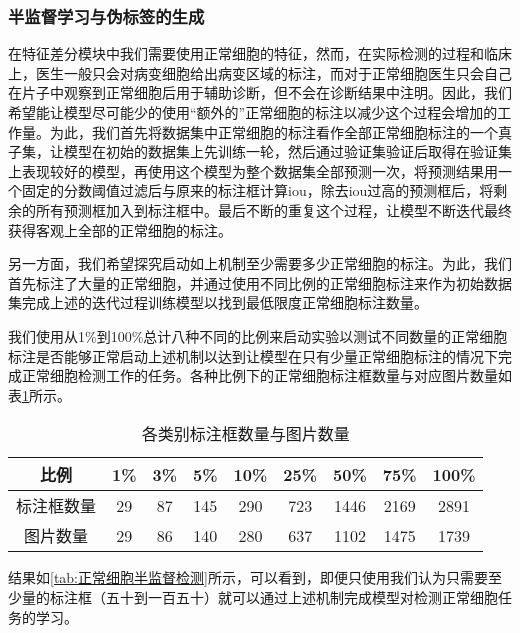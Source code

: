 \subsubsection{半监督学习与伪标签的生成}
\label{半监督学习与伪标签的生成}
\par 在特征差分模块中我们需要使用正常细胞的特征，然而，在实际检测的过程和临床上，医生一般只会对病变细胞给出病变区域的标注，而对于正常细胞医生只会自己在片子中观察到正常细胞后用于辅助诊断，但不会在诊断结果中注明。因此，我们希望能让模型尽可能少的使用“额外的”正常细胞的标注以减少这个过程会增加的工作量。为此，我们首先将数据集中正常细胞的标注看作全部正常细胞标注的一个真子集，让模型在初始的数据集上先训练一轮，然后通过验证集验证后取得在验证集上表现较好的模型，再使用这个模型为整个数据集全部预测一次，将预测结果用一个固定的分数阈值过滤后与原来的标注框计算iou，除去iou过高的预测框后，将剩余的所有预测框加入到标注框中。最后不断的重复这个过程，让模型不断迭代最终获得客观上全部的正常细胞的标注。
\par 另一方面，我们希望探究启动如上机制至少需要多少正常细胞的标注。为此，我们首先标注了大量的正常细胞，并通过使用不同比例的正常细胞标注来作为初始数据集完成上述的迭代过程训练模型以找到最低限度正常细胞标注数量。
\par 我们使用从1\%到100\%总计八种不同的比例来启动实验以测试不同数量的正常细胞标注是否能够正常启动上述机制以达到让模型在只有少量正常细胞标注的情况下完成正常细胞检测工作的任务。各种比例下的正常细胞标注框数量与对应图片数量如表\ref{tab:正常细胞数量}所示。

\begin{table}[htbp]
    \center
    \caption{各类别标注框数量与图片数量}
    \begin{tabular}{ccccccccc}
        \hline
        比例       & 1\% & 3\% & 5\% & 10\% & 25\% & 50\% & 75\% & 100\% \\
        \hline
        标注框数量 & 29  & 87  & 145 & 290  & 723  & 1446 & 2169 & 2891  \\
        图片数量   & 29  & 86  & 140 & 280  & 637  & 1102 & 1475 & 1739  \\
        \hline
    \end{tabular}
    \label{tab:正常细胞数量}
\end{table}
结果如\ref{tab:正常细胞半监督检测}所示，可以看到，即便只使用我们认为只需要至少量的标注框（五十到一百五十）就可以通过上述机制完成模型对检测正常细胞任务的学习。
